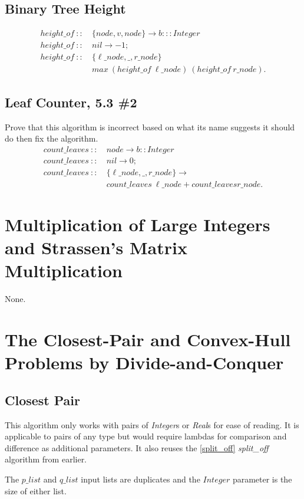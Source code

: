 \documentclass[a4paper,10pt]{book}
\begin{document}
\subsection{Binary Tree Height}

\begin{align*}
height\_of\ ::\ &\{node,v,node\}\rightarrow b:::Integer\\
height\_of\ ::\ &nil\rightarrow -1;\\
height\_of\ ::\ &\{\ell\_node,\_,r\_node\}\\
	&max\ (height\_of\ \ell\_node)\ (height\_of\ r\_node).
\end{align*}

\subsection{Leaf Counter, 5.3 \#2}
Prove that this algorithm is incorrect based on what its name suggests it should do then fix the algorithm.
\begin{align*}
count\_leaves\ ::\ &node\rightarrow b::Integer\\
count\_leaves\ ::\ &nil\rightarrow 0;\\
count\_leaves\ ::\ &\{\ell\_node,\_,r\_node\}\rightarrow\\
	&count\_leaves\ \ell\_node + count\_leaves r\_node.
\end{align*}
\section{Multiplication of Large Integers and Strassen's Matrix Multiplication}
None.
\section{The Closest-Pair and Convex-Hull Problems by Divide-and-Conquer}

\subsection{Closest Pair}
This algorithm only works with pairs of \textit{Integer}s or \textit{Real}s for ease of reading. It is applicable to pairs of any type but would require lambdas for comparison and difference as additional parameters. It also reuses the \ref{split_off} \textit{split\_off} algorithm from earlier. 

The $p\_list$ and $q\_list$ input lists are duplicates and the $Integer$ parameter is the size of either list.
\end{document}
